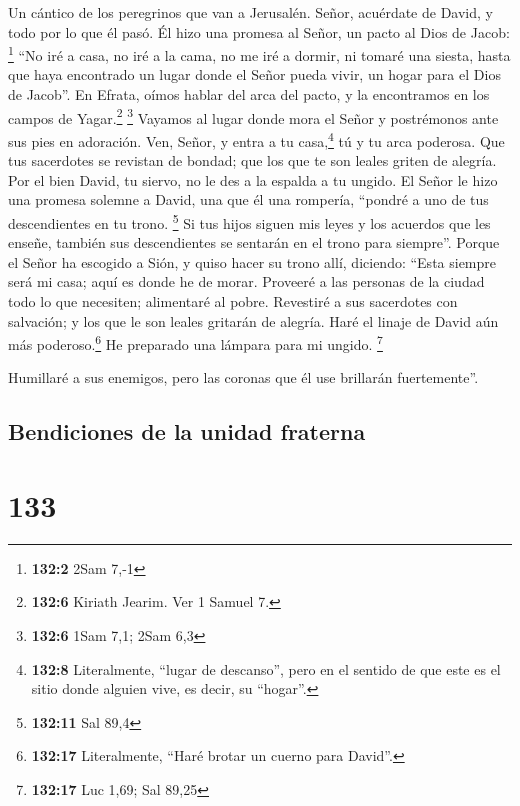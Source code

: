 Un cántico de los peregrinos que van a Jerusalén.  Señor,
acuérdate de David, y todo por lo que él pasó.  Él hizo
una promesa al Señor, un pacto al Dios de Jacob: \footnote{\textbf{132:2}
  2Sam 7,-1}  ``No iré a casa, no iré a la cama,
 no me iré a dormir, ni tomaré una siesta, 
hasta que haya encontrado un lugar donde el Señor pueda vivir, un hogar
para el Dios de Jacob''.  En Efrata, oímos hablar del arca
del pacto, y la encontramos en los campos de Yagar.\footnote{\textbf{132:6}
  Kiriath Jearim. Ver 1 Samuel 7.} \footnote{\textbf{132:6} 1Sam 7,1;
  2Sam 6,3}  Vayamos al lugar donde mora el Señor y
postrémonos ante sus pies en adoración.  Ven, Señor, y
entra a tu casa,\footnote{\textbf{132:8} Literalmente, ``lugar de
  descanso'', pero en el sentido de que este es el sitio donde alguien
  vive, es decir, su ``hogar''.} tú y tu arca poderosa. 
Que tus sacerdotes se revistan de bondad; que los que te son leales
griten de alegría.  Por el bien David, tu siervo, no le
des a la espalda a tu ungido.  El Señor le hizo una
promesa solemne a David, una que él una rompería, ``pondré a uno de tus
descendientes en tu trono. \footnote{\textbf{132:11} Sal 89,4}
 Si tus hijos siguen mis leyes y los acuerdos que les
enseñe, también sus descendientes se sentarán en el trono para
siempre''.  Porque el Señor ha escogido a Sión, y quiso
hacer su trono allí, diciendo:  ``Esta siempre será mi
casa; aquí es donde he de morar.  Proveeré a las personas
de la ciudad todo lo que necesiten; alimentaré al pobre. 
Revestiré a sus sacerdotes con salvación; y los que le son leales
gritarán de alegría.  Haré el linaje de David aún más
poderoso.\footnote{\textbf{132:17} Literalmente, ``Haré brotar un cuerno
  para David''.} He preparado una lámpara para mi ungido. \footnote{\textbf{132:17}
  Luc 1,69; Sal 89,25}

 Humillaré a sus enemigos, pero las coronas que él use
brillarán fuertemente''.

\hypertarget{bendiciones-de-la-unidad-fraterna}{%
\subsection{Bendiciones de la unidad
fraterna}\label{bendiciones-de-la-unidad-fraterna}}

\hypertarget{section-132}{%
\section{133}\label{section-132}}

